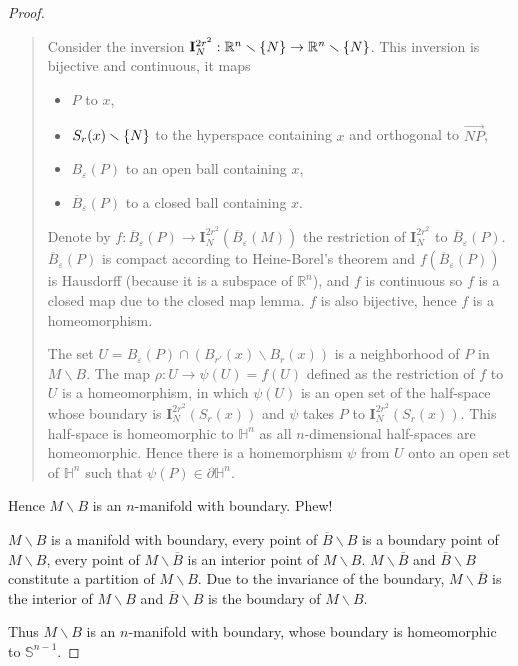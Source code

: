 \begin{proof}
\begin{quotation}
		Consider the inversion $\mathbf{I}^{2r^{2}}_{N}: \mathbb{R}^{n} \smallsetminus \left\{{N}\right\} \to \mathbb{R}^{n} \smallsetminus \left\{{N}\right\}$. This inversion is bijective and continuous, it maps
		\begin{itemize}
			\item $P$ to $x$,
			\item $S_{r}(x)\smallsetminus \left\{{N}\right\}$ to the hyperspace containing $x$ and orthogonal to $\overrightarrow{NP}$,
			\item $B_{\varepsilon}(P)$ to an open ball containing $x$,
			\item $\overline{B}_{\varepsilon}(P)$ to a closed ball containing $x$.
		\end{itemize}

		Denote by $f: \overline{B}_{\varepsilon}(P) \to \mathbf{I}^{2r^{2}}_{N}(\overline{B}_{\varepsilon}(M))$ the restriction of $\mathbf{I}^{2r^{2}}_{N}$ to $\overline{B}_{\varepsilon}(P)$. $\overline{B}_{\varepsilon}(P)$ is compact according to Heine-Borel's theorem and $f(\overline{B}_{\varepsilon}(P))$ is Hausdorff (because it is a subspace of $\mathbb{R}^{n}$), and $f$ is continuous so $f$ is a closed map due to the closed map lemma. $f$ is also bijective, hence $f$ is a homeomorphism.

		The set $U = B_{\varepsilon}(P) \cap (B_{r'}(x)\smallsetminus B_{r}(x))$ is a neighborhood of $P$ in $M\smallsetminus B$. The map $\rho: U \to \psi(U) = f(U)$ defined as the restriction of $f$ to $U$ is a homeomorphism, in which $\psi(U)$ is an open set of the half-space whose boundary is $\mathbf{I}^{2r^{2}}_{N}(S_{r}(x))$ and $\psi$ takes $P$ to $\mathbf{I}^{2r^{2}}_{N}(S_{r}(x))$. This half-space is homeomorphic to $\mathbb{H}^{n}$ as all $n$-dimensional half-spaces are homeomorphic. Hence there is a homemorphism $\psi$ from $U$ onto an open set of $\mathbb{H}^{n}$ such that $\psi(P) \in \partial\mathbb{H}^{n}$.
	\end{quotation}

	Hence $M\smallsetminus B$ is an $n$-manifold with boundary. Phew!

	$M\smallsetminus B$ is a manifold with boundary, every point of $\overline{B}\smallsetminus B$ is a boundary point of $M\smallsetminus B$, every point of $M\smallsetminus \overline{B}$ is an interior point of $M\smallsetminus B$. $M\smallsetminus\overline{B}$ and $\overline{B}\smallsetminus B$ constitute a partition of $M\smallsetminus B$. Due to the invariance of the boundary, $M\smallsetminus \overline{B}$ is the interior of $M\smallsetminus B$ and $\overline{B}\smallsetminus B$ is the boundary of $M\smallsetminus B$.

	Thus $M\smallsetminus B$ is an $n$-manifold with boundary, whose boundary is homeomorphic to $\mathbb{S}^{n-1}$.
\end{proof}

